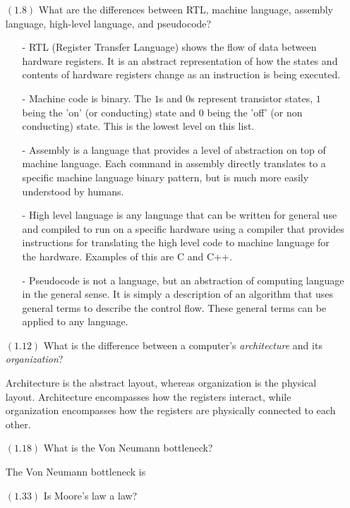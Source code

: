 \documentclass[letterpaper,10pt,titlepage]{article}
\begin{document}
\begin{enumerate}
\item[$(1.8)$] What are the differences between RTL, machine language, assembly language,
  high-level language, and pseudocode?
\begin{itemize}
	\item[-] RTL (Register Transfer Language) shows the flow of data between hardware
		registers. It is an abstract representation of how the states and contents
		of hardware registers change as an instruction is being executed.
	\item[-] Machine code is binary. The $1$s and $0$s represent transistor states,
		$1$ being the 'on' (or conducting) state and $0$ being the 'off' (or non
		conducting) state. This is the lowest level on this list.
	\item[-] Assembly is a language that provides a level of abstraction on top of
		machine language. Each command in assembly directly translates to a
		specific machine language binary pattern, but is much more easily understood by humans.
	\item[-] High level language is any language that can be written for general use
		and compiled to run on a specific hardware using a compiler that provides
		instructions for translating the high level code to machine language for
		the hardware. Examples of this are C and C++.
	\item[-] Pseudocode is not a language, but an abstraction of computing language in
		the general sense. It is simply a description of an algorithm that uses
		general terms to describe the control flow. These general terms can be
		applied to any language. 
\end{itemize}

\item[$(1.12)$]What is the difference between a computer's \textit{architecture} and its
  \textit{organization}?
\item[\textbullet] Architecture is the abstract layout, whereas organization is the
	physical layout. Architecture encompasses how the registers interact, while organization
	encompasses how the registers are physically connected to each other.

\item[$(1.18)$]What is the Von Neumann bottleneck?
\item[\textbullet] The Von Neumann bottleneck is   

\item[$(1.33)$]Is Moore's law a law?

\end{enumerate}
\end{document}
